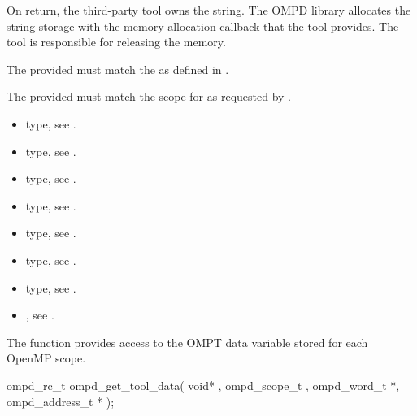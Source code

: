 On return, the third-party tool owns the  string. The OMPD
library allocates the string storage with the memory allocation callback that
the tool provides. The tool is responsible for releasing the memory.

\constraints
The provided  must match the  as defined in 
. 

The provided  must match the scope for  as requested by 
. 

\crossreferences
\begin{itemize}
\item {} type, 
see .

\item {} type, 
see .

\item {} type, 
see .

\item {} type, see .

\item {} type, see .

\item {} type, see .

\item {} type, see .

\item {}, see .
\end{itemize}



\label{subsubsubsec:ompd_get_tool_data}

\summary
The  function provides access to the OMPT data variable 
stored for each OpenMP scope.

\format
\begin{cspecific}
\begin{ompSyntax}
ompd_rc_t ompd_get_tool_data(
  void* , 
  ompd_scope_t ,
  ompd_word_t *,
  ompd_address_t *
);
\end{ompSyntax}
\end{cspecific}

